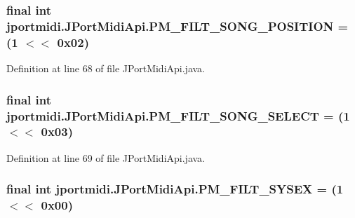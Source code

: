 \subsubsection[{\texorpdfstring{P\+M\+\_\+\+F\+I\+L\+T\+\_\+\+S\+O\+N\+G\+\_\+\+P\+O\+S\+I\+T\+I\+ON}{PM_FILT_SONG_POSITION}}]{\setlength{\rightskip}{0pt plus 5cm}final {\bf int} jportmidi.\+J\+Port\+Midi\+Api.\+P\+M\+\_\+\+F\+I\+L\+T\+\_\+\+S\+O\+N\+G\+\_\+\+P\+O\+S\+I\+T\+I\+ON = (1 $<$$<$ 0x02)\hspace{0.3cm}{\ttfamily [static]}}\hypertarget{classjportmidi_1_1_j_port_midi_api_a44570b5ed5fa9136061e974c17fdb6b4}{}\label{classjportmidi_1_1_j_port_midi_api_a44570b5ed5fa9136061e974c17fdb6b4}


Definition at line 68 of file J\+Port\+Midi\+Api.\+java.

\subsubsection[{\texorpdfstring{P\+M\+\_\+\+F\+I\+L\+T\+\_\+\+S\+O\+N\+G\+\_\+\+S\+E\+L\+E\+CT}{PM_FILT_SONG_SELECT}}]{\setlength{\rightskip}{0pt plus 5cm}final {\bf int} jportmidi.\+J\+Port\+Midi\+Api.\+P\+M\+\_\+\+F\+I\+L\+T\+\_\+\+S\+O\+N\+G\+\_\+\+S\+E\+L\+E\+CT = (1 $<$$<$ 0x03)\hspace{0.3cm}{\ttfamily [static]}}\hypertarget{classjportmidi_1_1_j_port_midi_api_a492ba21b711bb71813900d0c7848f6b3}{}\label{classjportmidi_1_1_j_port_midi_api_a492ba21b711bb71813900d0c7848f6b3}


Definition at line 69 of file J\+Port\+Midi\+Api.\+java.

\subsubsection[{\texorpdfstring{P\+M\+\_\+\+F\+I\+L\+T\+\_\+\+S\+Y\+S\+EX}{PM_FILT_SYSEX}}]{\setlength{\rightskip}{0pt plus 5cm}final {\bf int} jportmidi.\+J\+Port\+Midi\+Api.\+P\+M\+\_\+\+F\+I\+L\+T\+\_\+\+S\+Y\+S\+EX = (1 $<$$<$ 0x00)\hspace{0.3cm}{\ttfamily [static]}}\hypertarget{classjportmidi_1_1_j_port_midi_api_ae5e2de89685b28ce28dcb76d00319154}{}\label{classjportmidi_1_1_j_port_midi_api_ae5e2de89685b28ce28dcb76d00319154}


